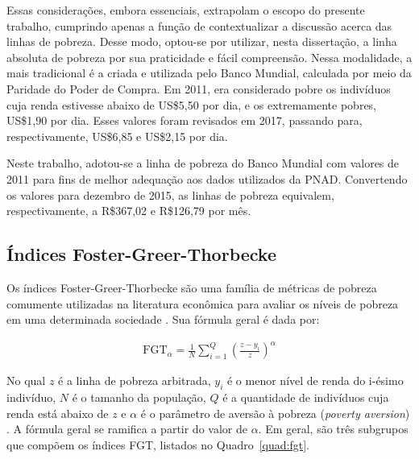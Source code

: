 Essas considerações, embora essenciais, extrapolam o escopo do presente trabalho, cumprindo apenas a função de contextualizar a discussão acerca das linhas de pobreza. Desse modo, optou-se por utilizar, nesta dissertação, a linha absoluta de pobreza por sua praticidade e fácil compreensão. Nessa modalidade, a mais tradicional é a criada e utilizada pelo Banco Mundial, calculada por meio da Paridade do Poder de Compra. Em 2011, era considerado pobre os indivíduos cuja renda estivesse abaixo de US\$5,50 por dia, e os extremamente pobres, US\$1,90 por dia. Esses valores foram revisados em 2017, passando para, respectivamente, US\$6,85 e US\$2,15 por dia.

Neste trabalho, adotou-se a linha de pobreza do Banco Mundial com valores de 2011 para fins de melhor adequação aos dados utilizados da PNAD. Convertendo os valores para dezembro de 2015, as linhas de pobreza equivalem, respectivamente, a R\$367,02 e R\$126,79 por mês. 


\subsection{Índices Foster-Greer-Thorbecke}

Os índices Foster-Greer-Thorbecke são uma família de métricas de pobreza comumente utilizadas na literatura econômica para avaliar os níveis de pobreza em uma determinada sociedade \cite{fgt84}. Sua fórmula geral é dada por:

\begin{align}
	\text{FGT}_\alpha = \frac{1}{N} \sum_{i=1}^{Q} \left( \frac{z - y_i}{z} \right)^{\alpha}
\end{align}

No qual $z$ é a linha de pobreza arbitrada, $y_i$ é o menor nível de renda do i-ésimo indivíduo, $N$ é o tamanho da população, $Q$ é a quantidade de indivíduos cuja renda está abaixo de $z$ e $\alpha$ é o parâmetro de aversão à pobreza (\textit{poverty aversion}) \cite{fgt84}. A fórmula geral se ramifica a partir do valor de $\alpha$. Em geral, são três subgrupos que compõem os índices FGT, listados no Quadro~\ref{quad:fgt}.

